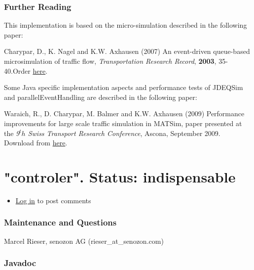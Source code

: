 \documentclass[a4paper,11pt]{report}
\begin{document}
\subsubsection{Further Reading}

This implementation is based on the micro-simulation described in the following paper:

Charypar, D., K. Nagel and K.W. Axhausen (2007) An event-driven queue-based microsimulation of traffic flow, \emph{Transportation Research Record}, \textbf{2003}, 35-40.Order \href{http://trb.metapress.com/content/j2118065485r4611/?p=4f63e25a261d48d99eeebea19b494e24&amp;pi=0}{here}.

Some  Java specific implementation aspects and performance tests of JDEQSim  and parallelEventHandling are described in the following paper:

Waraich,  R., D. Charypar, M. Balmer and K.W. Axhausen (2009) Performance  improvements for large scale traffic simulation in MATSim, paper  presented at the \emph{9$^th$ Swiss Transport Research Conference}, Ascona, September 2009. Download from \href{http://www.ivt.ethz.ch/vpl/publications/reports/ab565.pdf}{here}.


















\vfill\eject
\section{"controler". Status: indispensable}
\begin{itemize}
	\item \href{http://www.matsim.org/user/login?destination=comment/reply/389%23comment-form}{Log in} to post comments
\end{itemize}

\subsubsection{\textbf{Maintenance and Questions}}

Marcel Rieser, senozon AG (rieser\_at\_senozon.com)

\subsubsection{\textbf{Javadoc}}
\end{document}

